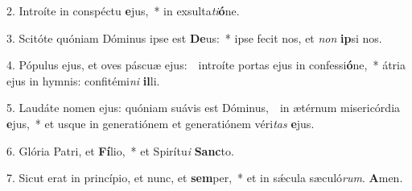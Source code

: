 
2. Introíte in conspéctu \textbf{e}jus,~* in exsulta\textit{ti}\textbf{ó}ne.

3. Scitóte quóniam Dóminus ipse est \textbf{De}us:~* ipse fecit nos, et \textit{non} \textbf{ip}si nos.

4. Pópulus ejus, et oves páscuæ ejus:~\GreDagger\ introíte portas ejus in confessi\textbf{ó}ne,~* átria ejus in hymnis: confitémi\textit{ni} \textbf{il}li.

5. Laudáte nomen ejus: quóniam suávis est Dóminus,~\GreDagger\ in ætérnum misericórdia \textbf{e}jus,~* et usque in generatiónem et generatiónem véri\textit{tas} \textbf{e}jus.

6. Glória Patri, et \textbf{Fí}lio,~* et Spirítu\textit{i} \textbf{Sanc}to.

7. Sicut erat in princípio, et nunc, et \textbf{sem}per,~* et in s\'{\ae}cula sæculó\textit{rum}. \textbf{A}men.